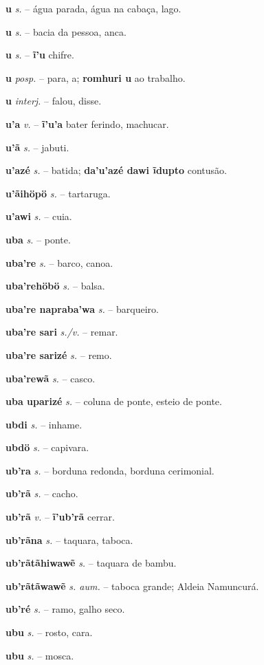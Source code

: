 \textbf{u} \textit{s.} -- água parada, água na cabaça, lago.

\textbf{u} \textit{s.} -- bacia da pessoa, anca.

\textbf{u} \textit{s.} -- \textbf{ĩ'u} chifre.

\textbf{u} \textit{posp.} -- para, a; \textbf{romhuri u} ao trabalho.

\textbf{u} \textit{interj.} -- falou, disse.

\textbf{u'a} \textit{v.} -- \textbf{ĩ'u'a} bater ferindo, machucar.

\textbf{u'ã} \textit{s.} -- jabuti.

\textbf{u'azé} \textit{s.} -- batida; \textbf{da'u'azé dawi ĩdupto} contusão.

\textbf{u'ãihöpö} \textit{s.} -- tartaruga.

\textbf{u'awi} \textit{s.} -- cuia.

\textbf{uba} \textit{s.} -- ponte.

\textbf{uba're} \textit{s.} -- barco, canoa.

\textbf{uba'rehöbö} \textit{s.} -- balsa.

\textbf{uba're napraba'wa} \textit{s.} -- barqueiro.

\textbf{uba're sari} \textit{s./v.} -- remar.

\textbf{uba're sarizé} \textit{s.} -- remo.

\textbf{uba'rewã} \textit{s.} -- casco.

\textbf{uba uparizé} \textit{s.} -- coluna de ponte, esteio de ponte.

\textbf{ubdi} \textit{s.} -- inhame.

\textbf{ubdö} \textit{s.} -- capivara.

\textbf{ub'ra} \textit{s.} -- borduna redonda, borduna cerimonial.

\textbf{ub'rã} \textit{s.} -- cacho.

\textbf{ub'rã} \textit{v.} -- \textbf{ĩ'ub'rã} cerrar.

\textbf{ub'rãna} \textit{s.} -- taquara, taboca.

\textbf{ub'rãtãhiwawẽ} \textit{s.} -- taquara de bambu.

\textbf{ub'rãtãwawẽ} \textit{s. aum.} -- taboca grande; Aldeia Namuncurá.

\textbf{ub'ré} \textit{s.} -- ramo, galho seco.

\textbf{ubu} \textit{s.} -- rosto, cara.

\textbf{ubu} \textit{s.} -- mosca.

